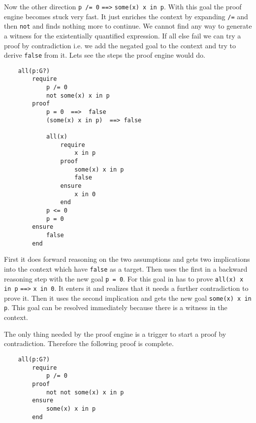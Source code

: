 Now the other direction \lstinline!p /= 0! \lstinline!==>!
\lstinline!some(x) x in p!. With this goal the proof engine becomes stuck very
fast. It just enriches the context by expanding \lstinline!/=! and then
\lstinline!not! and finds nothing more to continue. We cannot find any way to
generate a witness for the existentially quantified expression. If all else
fail we can try a proof by contradiction i.e. we add the negated goal to the
context and try to derive \lstinline!false! from it. Lets see the steps the
proof engine would do.
\begin{lstlisting}
    all(p:G?)
        require
            p /= 0
            not some(x) x in p
        proof
            p = 0  ==>  false
            (some(x) x in p)  ==> false

            all(x)
                require
                    x in p
                proof
                    some(x) x in p
                    false
                ensure
                    x in 0
                end
            p <= 0
            p = 0
        ensure
            false
        end
\end{lstlisting}
First it does forward reasoning on the two assumptions and gets two
implications into the context which have \lstinline!false! as a target. Then
uses the first in a backward reasoning step with the new goal
\lstinline!p = 0!. For this goal in has to prove \lstinline!all(x) x in p!
\lstinline!==>! \lstinline!x in 0!. It enters it and realizes that it
needs a further contradiction to prove it. Then it uses the second implication
and gets the new goal \lstinline!some(x) x in p!. This goal can be resolved
immediately because there is a witness in the context.

The only thing needed by the proof engine is a trigger to start a proof by
contradiction. Therefore the following proof is complete.

\begin{lstlisting}
    all(p:G?)
        require
            p /= 0
        proof
            not not some(x) x in p
        ensure
            some(x) x in p
        end
\end{lstlisting}


